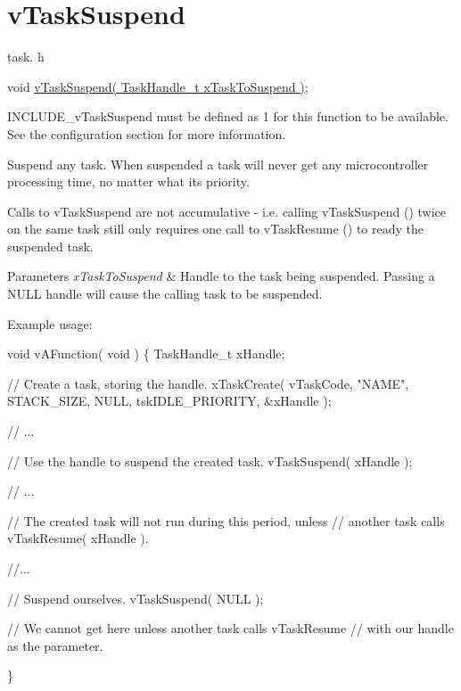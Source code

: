 \hypertarget{group__vTaskSuspend}{}\section{v\+Task\+Suspend}
\label{group__vTaskSuspend}
task. h 
\begin{DoxyPre}void \hyperlink{task_8h_a84d4e660b04630be2939d91b3c2412f8}{vTaskSuspend( TaskHandle\_t xTaskToSuspend )};\end{DoxyPre}


I\+N\+C\+L\+U\+D\+E\+\_\+v\+Task\+Suspend must be defined as 1 for this function to be available. See the configuration section for more information.

Suspend any task. When suspended a task will never get any microcontroller processing time, no matter what its priority.

Calls to v\+Task\+Suspend are not accumulative -\/ i.\+e. calling v\+Task\+Suspend () twice on the same task still only requires one call to v\+Task\+Resume () to ready the suspended task.


\begin{DoxyParams}{Parameters}
{\em x\+Task\+To\+Suspend} & Handle to the task being suspended. Passing a N\+U\+LL handle will cause the calling task to be suspended.\\
\hline
\end{DoxyParams}
Example usage\+: 
\begin{DoxyPre}
void vAFunction( void )
\{
TaskHandle\_t xHandle;
\begin{DoxyVerb}// Create a task, storing the handle.
xTaskCreate( vTaskCode, "NAME", STACK_SIZE, NULL, tskIDLE_PRIORITY, &xHandle );

// ...

// Use the handle to suspend the created task.
vTaskSuspend( xHandle );

// ...

// The created task will not run during this period, unless
// another task calls vTaskResume( xHandle ).

//...


// Suspend ourselves.
vTaskSuspend( NULL );

// We cannot get here unless another task calls vTaskResume
// with our handle as the parameter.
\end{DoxyVerb}

\}
  \end{DoxyPre}
 